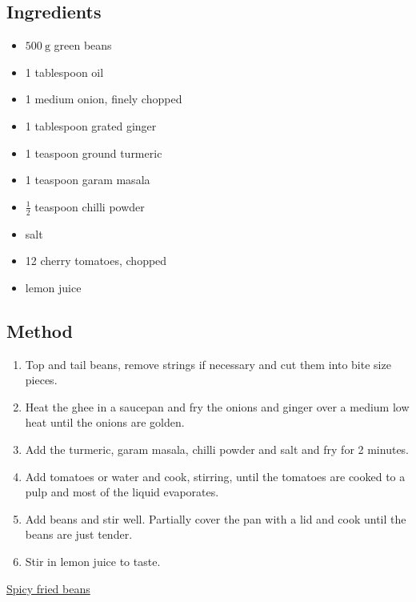 \documentclass[11pt,a4paper]{article}
\begin{document}
\subsection*{Ingredients}

\begin{itemize}
  \item $ \qty{500}{\gram} $ green beans
  \item 1 tablespoon oil
  \item 1 medium onion, finely chopped
  \item 1 tablespoon grated ginger
  \item 1 teaspoon ground turmeric
  \item 1 teaspoon garam masala
  \item $ \frac{1}{2} $ teaspoon chilli powder
  \item salt
  \item 12 cherry tomatoes, chopped
  \item lemon juice
\end{itemize}

\medskip

\subsection*{Method}

\begin{enumerate}
  \item Top and tail beans, remove strings if necessary and cut them into bite size pieces. 
  \item Heat the ghee in a saucepan and fry the onions and ginger over a medium low heat until the onions are golden.
  \item Add the turmeric, garam masala, chilli powder and salt and fry for 2 minutes.
  \item Add tomatoes or water and cook, stirring, until the tomatoes are cooked to a pulp and most of the liquid evaporates.
  \item Add beans and stir well. Partially cover the pan with a lid and cook until the beans are just tender.
  \item Stir in lemon juice to taste.
\end{enumerate}

\href{https://practicallydaily.blogspot.com/2009/08/spicy-fried-beans.html}{Spicy fried beans}
\end{document}
